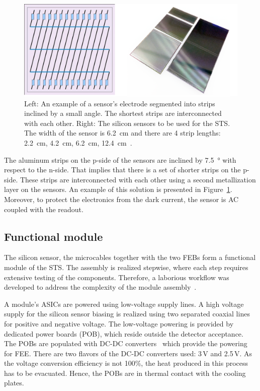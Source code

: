 \begin{figure}[!h]
\centering
\includegraphics[width=0.75\columnwidth]{Chapter2/images/silicon_sensors.png}
\caption{Left: An example of a sensor's electrode segmented into strips inclined by a small angle. The shortest strips are interconnected with each other. Right: The silicon sensors to be used for the \gls{STS}. The width of the sensor is \SI{6.2}{\centi\metre} and there are 4 strip lengths: \SI{2.2}{\centi\metre}, \SI{4.2}{\centi\metre}, \SI{6.2}{\centi\metre}, \SI{12.4}{\centi\metre}~\cite{Heuser:54798}.}
\label{fig_sts_si}
\end{figure}

The aluminum strips on the p-side of the sensors are inclined by \SI{7.5}{\degree} with respect to the n-side. That implies that there is a set of shorter strips on the p-side. These strips are interconnected with each other using a second metallization layer on the sensors. An example of this solution is presented in Figure~\ref{fig_sts_si}. Moreover, to protect the electronics from the dark current, the sensor is AC coupled with the readout.
\subsection{Functional module}
\label{sts_module}
The silicon sensor, the microcables together with the two \glspl{FEB} form a functional module of the \gls{STS}. The assembly is realized stepwise, where each step requires extensive testing of the components. Therefore, a laborious workflow was developed to address the complexity of the module assembly~\cite{carmen2}. 

A module's ASICs are powered using low-voltage supply lines. A high voltage supply for the silicon sensor biasing is realized using two separated coaxial lines for positive and negative voltage. The low-voltage powering is provided by dedicated power boards (\gls{POB}), which reside outside the detector acceptance. The \glspl{POB} are populated with DC-DC converters~\cite{DC_DC_converter} which provide the powering for \gls{FEE}. There are two flavors of the DC-DC converters used: 3\,V and 2.5\,V. As the voltage conversion efficiency is not 100\%, the heat produced in this process has to be evacuated. Hence, the \glspl{POB} are in thermal contact with the cooling plates. 

